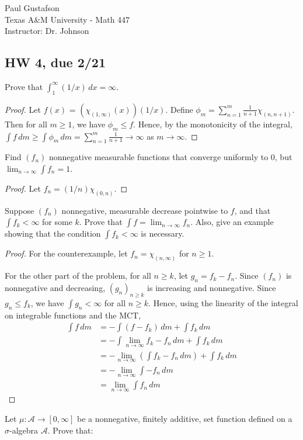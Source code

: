 \documentclass{article}
\newcommand{\A}{\mathcal{A}}
\newcommand{\dm}{\,dm}
\begin{document}
\noindent Paul Gustafson\\
\noindent Texas A\&M University - Math 447\\ 
\noindent Instructor: Dr. Johnson

\subsection*{HW 4, due 2/21}
 Prove that $\int_1^\infty (1/x)\, dx = \infty$.
\begin{proof}
Let $f(x)$ = $(\chi_{(1,\infty)}(x)) (1/x)$. Define $\phi_m = \sum_{n=1}^m \frac 1 {n+1} \chi_{(n, n+1)}$. Then for all $m \ge 1$, we have $\phi_m  \le f$. Hence, by the monotonicity of the integral, $\int f\, dm \ge \int \phi_m\, dm = \sum_{n=1}^m \frac 1 {n+1} \to \infty$ as $m \to \infty$. 
\end{proof}
 Find $(f_n)$ nonnegative measurable functions that converge uniformly to $0$, but $\lim_{n\to\infty} \int f_n = 1$.
\begin{proof}
Let $f_n = (1/n) \chi_{(0,n)}$.
\end{proof}
Suppose $(f_n)$ nonnegative, measurable decrease pointwise to $f$, and that $\int f_k < \infty$ for some $k$. Prove that $\int f = \lim_{n\to\infty} f_n$.  Also, give an example showing that the condition $\int f_k < \infty$ is necessary.
\begin{proof}
For the counterexample, let $f_n = \chi_{(n,\infty)}$ for $n \ge 1$.

For the other part of the problem, for all $n \ge k$, let $g_n = f_k - f_n$.  Since $(f_n)$ is nonnegative and decreasing, $(g_n)_{n\ge k}$ is increasing and nonnegative. Since $g_n \le f_k$, we have $\int g_n < \infty$ for all $n \ge k$. Hence, using the linearity of the integral on integrable functions and the MCT,
\begin{align*}
\int f\,dm  & =  -\int(f - f_k)\dm  +  \int f_k\, dm 
\\ & = -\int\lim_{n\to\infty} f_k - f_n \,dm + \int f_k\,dm
\\ & = -\lim_{n\to\infty} \left(\int  f_k - f_n \,dm \right) + \int f_k\,dm 
\\ & = -\lim_{n\to\infty} \int -f_n \,dm 
\\ & = \lim_{n\to\infty} \int f_n \,dm
\end{align*}
\end{proof}
 Let $\mu : \A \to [0,\infty]$ be a nonnegative, finitely additive, set function defined on a $\sigma$-algebra $\A$. Prove that:
\end{document}

